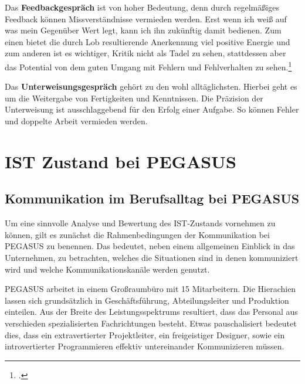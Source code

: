 \documentclass[12pt, DIV9, BCOR9mm, onecolumn, headsepline, ngerman]{scrreprt}
\begin{document}
Das \textbf{Feedbackgespräch} ist von hoher Bedeutung, denn durch regelmäßiges Feedback können Missverständnisse vermieden werden. Erst wenn ich weiß auf was mein Gegenüber Wert legt, kann ich ihn zukünftig damit bedienen. Zum einen bietet die durch Lob resultierende Anerkennung viel positive Energie und zum anderen ist es wichtiger, Kritik nicht als Tadel zu sehen, stattdessen aber das Potential von dem guten Umgang mit Fehlern und Fehlverhalten zu sehen.\footcite[vgl.][S.67f]{MentzelMitarbeiter}

Das \textbf{Unterweisungsgespräch} gehört zu den wohl alltäglichsten. Hierbei geht es um die Weitergabe von Fertigkeiten und Kenntnissen. Die Präzision der Unterweisung ist ausschlaggebend für den Erfolg einer Aufgabe. So können Fehler und doppelte Arbeit vermieden werden.


\chapter{IST Zustand bei PEGASUS}


\section{Kommunikation im Berufsalltag bei PEGASUS} 

Um eine sinnvolle Analyse und Bewertung des IST-Zustands vornehmen zu können, gilt es zunächst die Rahmenbedingungen der Kommunikation bei PEGASUS zu benennen. Das bedeutet, neben einem allgemeinen Einblick in das Unternehmen, zu betrachten, welches die Situationen sind in denen kommuniziert wird und welche Kommunikationskanäle werden genutzt.

PEGASUS arbeitet in einem Großraumbüro mit 15 Mitarbeitern. Die Hierachien lassen sich grundsätzlich in Geschäftsführung, Abteilungsleiter und Produktion einteilen. Aus der Breite des Leistungsspektrums resultiert, dass das Personal aus verschieden spezialisierten Fachrichtungen besteht. Etwas pauschalisiert bedeutet dies, dass ein extravertierter Projektleiter, ein freigeistiger Designer, sowie ein introvertierter Programmieren effektiv untereinander Kommunizieren müssen.
\end{document}
